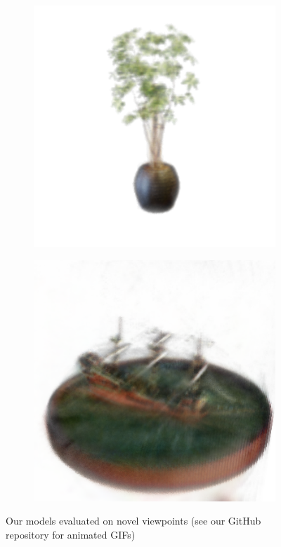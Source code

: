 \documentclass{article}
\begin{document}
\begin{figure}[!h]
\begin{subfigure}{.24\textwidth}
\end{subfigure}
\begin{subfigure}{.24\textwidth}
  \centering
  \includegraphics[width=\linewidth]{figs/results/ficus.png}  
\end{subfigure}
\begin{subfigure}{.24\textwidth}
  \centering
  \includegraphics[width=\linewidth]{figs/results/ship.png}  
\end{subfigure}

     \caption{Our models evaluated on novel viewpoints (see our GitHub repository for animated GIFs)}
    \label{fig:results}
\end{figure}
\end{document}
